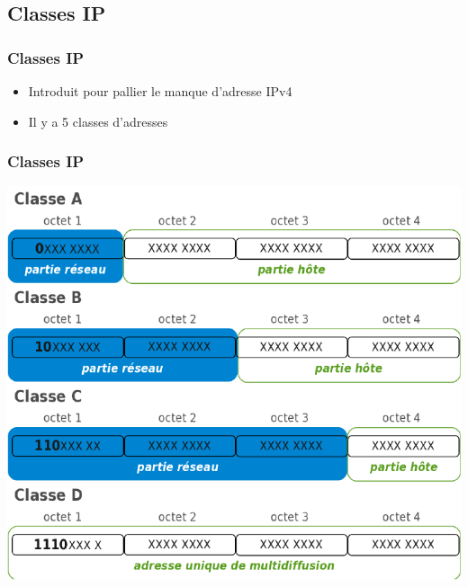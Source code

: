 \subsection{Classes IP}
\begin{frame}\frametitle{Classes IP}

    \begin{itemize}
        \item {\Large Introduit pour pallier le manque d'adresse IPv4}
        \item {\Large Il y a 5 classes d'adresses}
    \end{itemize}

\end{frame}


\begin{frame}\frametitle{Classes IP}

    \includegraphics[scale=0.6]{res/classes-adresses-ipv4.pdf}

\end{frame}

